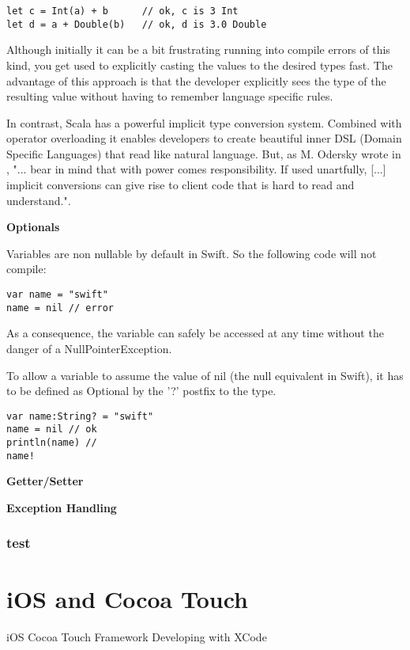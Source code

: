 \begin{lstlisting}
let c = Int(a) + b 		// ok, c is 3 Int
let d = a + Double(b) 	// ok, d is 3.0 Double
\end{lstlisting}

Although initially it can be a bit frustrating running into compile errors of this kind, you get used to explicitly casting the values to the desired types fast. The advantage of this approach is that the developer explicitly sees the type of the resulting value without having to remember language specific rules.

In contrast, Scala has a powerful implicit type conversion system. Combined with operator overloading it enables developers to create beautiful inner DSL (Domain Specific Languages) that read like natural language. %
But, as M. Odersky wrote in \cite[Chapter 6.13]{scala-book}, "... bear in mind that with power comes responsibility. If used unartfully, [...] implicit conversions can give rise to client code that is hard to read and understand.".

\textbf{Optionals}

Variables are non nullable by default in Swift. So the following code will not compile:
\begin{lstlisting}
var name = "swift"
name = nil // error
\end{lstlisting}

As a consequence, the variable can safely be accessed at any time without the danger of a NullPointerException.

To allow a variable to assume the value of nil (the null equivalent in Swift), it has to be defined as Optional by the '?' postfix to the type.

\begin{lstlisting}
var name:String? = "swift"
name = nil // ok
println(name) // 
name!
\end{lstlisting}


\textbf{Getter/Setter}

\textbf{Exception Handling}

\subsubsection{test}

\section{iOS and Cocoa Touch}

iOS Cocoa Touch Framework 
Developing with XCode